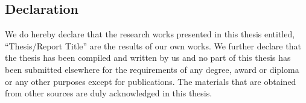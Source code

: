 \begin{center}
    \section*{Declaration}
\end{center}
\large 


We do hereby declare that the research works presented in this thesis entitled, “Thesis/Report Title” are the results of our own works. We further declare that the thesis has been compiled and written by us and no part of this thesis has been submitted elsewhere for the requirements of any degree, award or diploma or any other purposes except for publications.
The materials that are obtained from other sources are duly acknowledged in this thesis.


\vspace{10mm}
